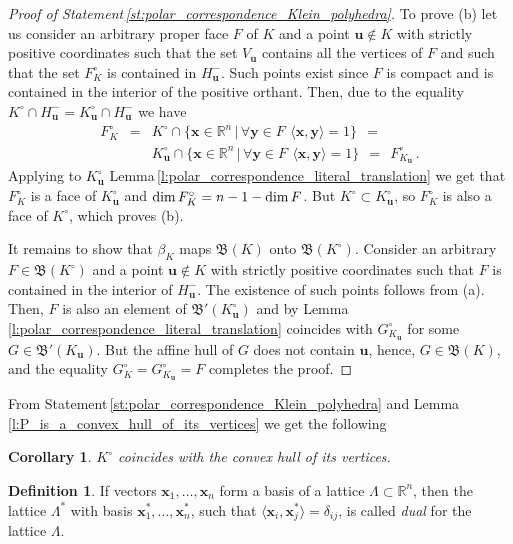 \documentclass[11pt]{article}
\theoremstyle{definition}
\newtheorem{definition}{Definition}
\theoremstyle{remark}
\theoremstyle{plain}
\newtheorem*{corollary_no_counter}{Corollary}
\renewcommand{\vec}[1]{\mathbf{#1}}
\renewcommand{\dim}{\textup{dim\,}}
\renewcommand{\dim}{\textup{dim\,}}
\newcommand{\La}{\Lambda}
\newcommand{\R}{\mathbb{R}}
\newcommand{\faces}{\mathfrak B}
\begin{document}
\begin{proof}[Proof of Statement\,\ref{st:polar_correspondence_Klein_polyhedra}]
    To prove (b) let us consider an arbitrary proper face $F$ of $K$ and a point
    $\vec u\notin K$ with strictly positive coordinates such that the set $V_{\vec u}$
    contains all the vertices of $F$ and such that the set $F_K^\circ$ is contained in
    $H_{\vec u}^-$. Such points exist since $F$ is compact and is contained in the interior
    of the positive orthant. Then, due to the equality
    $K^\circ\cap H_{\vec u}^-=K_{\vec u}^\circ\cap H_{\vec u}^-$ we have
    \[ \begin{array}{rcl}
       F_K^\circ & = & K^\circ\cap\big\{ \vec x\in\R^n\, \big|\,
       \forall\vec y\in F\,\ \langle\vec x,\vec y\rangle=1 \big\}\ \ =
       \\ & &
       K_{\vec u}^\circ\cap\big\{ \vec x\in\R^n\, \big|\,
       \forall\vec y\in F\,\ \langle\vec x,\vec y\rangle=1 \big\}\ \ =\ \
       F_{K_{\vec u}}^\circ\,.
    \end{array} \]
    Applying to $K_{\vec u}^\circ$ Lemma\,\ref{l:polar_correspondence_literal_translation} we
    get that $F_K^\circ$ is a face of $K_{\vec u}^\circ$ and $\dim F_K^\circ=n-1-\dim F$. But
    $K^\circ\subset K_{\vec u}^\circ$, so $F_K^\circ$ is also a face of $K^\circ$, which
    proves (b).

    It remains to show that $\beta_K$ maps $\faces(K)$ onto $\faces(K^\circ)$. Consider an
    arbitrary $F\in\faces(K^\circ)$ and a point $\vec u\notin K$ with strictly positive
    coordinates such that $F$ is contained in the interior of $H_{\vec u}^-$. The existence
    of such points follows from (a). Then, $F$ is also an element of
    $\faces'(K_{\vec u}^\circ)$ and by
    Lemma\,\ref{l:polar_correspondence_literal_translation} coincides with
    $G_{K_{\vec u}}^\circ$ for some $G\in\faces'(K_{\vec u})$. But the affine hull of $G$
    does not contain $\vec u$, hence, $G\in\faces(K)$, and the equality
    $G_K^\circ=G_{K_{\vec u}}^\circ=F$ completes the proof.
  \end{proof}

  From Statement\,\ref{st:polar_correspondence_Klein_polyhedra} and
  Lemma\,\ref{l:P_is_a_convex_hull_of_its_vertices} we get the following

  \begin{corollary_no_counter} \label{cor:K_circ_is_the_conv_of_its_vertices}
    $K^\circ$ coincides with the convex hull of its vertices.
  \end{corollary_no_counter}

  \begin{definition} \label{d:dual_lattice}
    If vectors $\vec x_1,\ldots,\vec x_n$ form a basis of a lattice $\La\subset\R^n$, then
    the lattice $\La^\ast$ with basis $\vec x_1^\ast,\ldots,\vec x_n^\ast$, such that
    $\langle\vec x_i,\vec x_j^\ast\rangle=\delta_{ij}$, is called \emph{dual} for the lattice
    $\La$.
  \end{definition}
\end{document}
